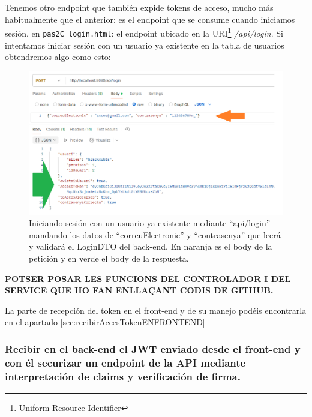 \documentclass[a4paper,12pt]{report}
\begin{document}
		
		Tenemos otro endpoint que también expide tokens de acceso, mucho más habitualmente que el anterior: es el endpoint que se consume cuando iniciamos sesión, en \texttt{pas2C\_login.html}: el endpoint ubicado en la URI\footnote{Uniform Resource Identifier} \textit{/api/login}. Si intentamos iniciar sesión con un usuario ya existente en la tabla de usuarios obtendremos algo como esto:
		
		\setlength{\abovecaptionskip}{0pt}
		\FloatBarrier
		\begin{figure}[H]
			\centering
			\includegraphics[width=1\textwidth]{img/detallPostmanLogin.png}
			\caption{Iniciando sesión con un usuario ya existente mediante ``api/login'' mandando los datos de ``correuElectronic'' y ``contrasenya'' que leerá y validará el LoginDTO del back-end. En naranja es el body de la petición y en verde el body de la respuesta.}
			
			\label{fig:detallPostmanLogin} 
		\end{figure}
		\FloatBarrier
		
		\textbf{POTSER POSAR LES FUNCIONS DEL CONTROLADOR I DEL SERVICE QUE HO FAN ENLLAÇANT CODIS DE GITHUB.}
		
		La parte de recepción del token en el front-end y de su manejo podéis encontrarla en el apartado \ref{sec:recibirAccesTokenENFRONTEND}

		
		
		
		
		
		
	
		
		\subsubsection{Recibir en el back-end el JWT enviado desde el front-end y con él securizar un endpoint de la API mediante interpretación de claims y verificación de firma.}
		\label{sec:classesSecuritzacioClaimsIfirma}
		
\end{document}
